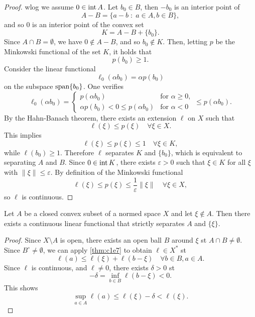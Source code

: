 \documentclass[../skript.tex]{subfiles}
\begin{document}
\begin{proof}
\Ac{wlog} we assume $0 \in \operatorname{int} A$. Let $b_0 \in B$, then $-b_0$ is an interior point of 
\[
	A - B = \{ a - b \; : \; a \in A, b \in B \},
\]
and so $0$ is an interior point of the convex set
\[
	K = A - B + \{ b_0 \}.
\]
Since $A \cap B = \emptyset$, we have $0 \notin A - B$, and so $b_0 \notin K$. Then, letting $p$ be the Minkowski functional of the set $K$, it holds that
\[
	p(b_0) \geq 1.
\]
Consider the linear functional
\[
\ell_0(\alpha b_0) = \alpha p(b_0)
\]
on the subspace $\operatorname*{span}\{b_0\}$.
One verifies
\[
	\ell_0(\alpha b_0) = \begin{cases}
	p(\alpha b_0) & \text{for } \alpha \geq 0, \\
	\alpha p(b_0) < 0 \leq p(\alpha b_0) & \text{for } \alpha < 0 
	\end{cases} \leq p(\alpha b_0).
\]
By the Hahn-Banach theorem, there exists an extension $\ell$ on $X$ such that
\[
	\ell(\xi) \leq p(\xi) \quad \forall \xi \in X.
\]
This implies
\[
	\ell(\xi) \leq p(\xi) \leq 1 \quad \forall \xi \in K,
\]
while $\ell(b_0) \geq 1$.
Therefore $\ell$ separates $K$ and $\{ b_0 \}$, which is equivalent to separating $A$ and $B$.
Since $0 \in \operatorname{int} K$, there exists $\varepsilon > 0$ such that $\xi \in K$ for all $\xi$ with $\| \xi \| \leq \varepsilon$. By definition of the Minkowski functional
\[
	\ell(\xi) \leq p(\xi) \leq \frac{1}{\varepsilon} \| \xi \| \quad \forall \xi \in X,
\]
so $\ell$ is continuous.
\end{proof}
\begin{theorem} %
\label{thm:c1e8}
Let $A$ be a closed convex subset of a normed space $X$ and let $\xi \notin A$. Then there exists a continuous linear functional that strictly separates $A$ and $\{ \xi \}$.
\end{theorem}
\begin{proof}
Since $X \setminus A$ is open, there exists an open ball $B$ around $\xi$ \ac{st} $A \cap B \neq \emptyset$. Since $B^\circ \neq \emptyset$, we can apply \cref{thm:c1e7} to obtain $\ell \in X^*$ \ac{st}
\[
	\ell(a) \leq \ell(\xi) + \ell(b - \xi) \quad \forall b \in B, a \in A.
\]
Since $\ell$ is continuous, and $\ell \neq 0$, there exists $\delta > 0$ \ac{st}
\[
	-\delta = \inf_{b \in B} \ell(b - \xi) < 0.
\]
This shows
\[
	\sup_{a \in A} \ell(a) \leq \ell(\xi) - \delta < \ell(\xi).
\]
\end{proof}
\end{document}
